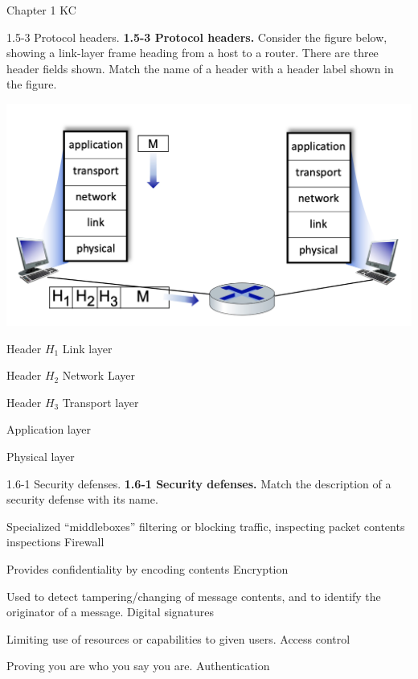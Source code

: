 \documentclass[a4paper]{article}
\begin{document}
\begin{quiz}{Chapter 1 KC}
\begin{matching}[points=1]{1.5-3 Protocol headers.}
\textbf{1.5-3 Protocol headers.}
Consider the figure below, showing a link-layer frame heading from a host to a router. There are three header fields shown. Match the name of a header with a header label shown in the figure. 
\begin{center}
\includegraphics[width=\linewidth]{figs/1.5.3.jpg}
\end{center}

\item Header $H_1$ \answer Link layer
\item Header $H_2$ \answer Network Layer
\item Header $H_3$ \answer Transport layer
\item \answer Application layer
\item \answer Physical layer
\end{matching}

\begin{matching}[points=1]{1.6-1 Security defenses.}
\textbf{1.6-1 Security defenses.}
Match the description of a security defense with its name.

\item Specialized ``middleboxes'' filtering or blocking traffic, inspecting packet contents inspections \answer Firewall
\item Provides confidentiality by encoding contents \answer Encryption
\item Used to detect tampering/changing of message contents, and to identify the originator of a message. \answer Digital signatures
\item Limiting use of resources or capabilities to given users. \answer Access control
\item Proving you are who you say you are. \answer Authentication
\end{matching}


\end{quiz}
\end{document}
